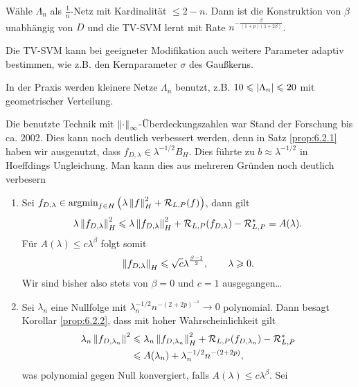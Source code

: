 \begin{bsp*}
Wähle $\Lambda_n$ als $\frac{1}{n}$-Netz mit Kardinalität $\le 2-n$. Dann ist
die Konstruktion von $\beta$ unabhängig von $D$ und die TV-SVM lernt mit Rate
$n^{-\frac{\beta}{(1+p)(1+2\beta)}}$.\bsphere
\end{bsp*}

\begin{bem*}[Bemkerungen.]
\begin{bemenum}
\item Die TV-SVM kann bei geeigneter Modifikation auch weitere Parameter adaptiv
bestimmen, wie z.B. den Kernparameter $\sigma$ des Gaußkerns.
\item In der Praxis werden kleinere Netze $\Lambda_n$ benutzt, z.B.
$10\leqslant \left|\Lambda_n\right|\leqslant 20$ mit geometrischer Verteilung.
\item Die benutzte Technik mit $\left\|\cdot\right\|_\infty$-Überdeckungszahlen war
Stand der Forschung bis ca. 2002. Dies kann noch deutlich verbessert werden,
denn in Satz \ref{prop:6.2.1} haben wir ausgenutzt, dass $f_{D,\lambda}\in
\lambda^{-1/2}B_H$. Dies führte zu $b\approx \lambda^{-1/2}$ in Hoeffdings
Ungleichung. Man kann dies aus mehreren Gründen noch deutlich verbesern
\begin{enumerate}[label=\arabic{*}.),leftmargin=2pt]
  \item Sei $f_{D,\lambda}\in \operatorname*{argmin}_{f\in H}\left( \lambda\left\|f\right\|_H^2 +
  \mathcal{R}_{L,P}(f)\right)$, dann gilt
\begin{align*}
\lambda\left\|f_{D,\lambda}\right\|_H^2
\leqslant
\lambda\left\|f_{D,\lambda}\right\|_H^2 + \mathcal{R}_{L,P}(f_{D,\lambda}) - \mathcal{R}_{L,P}^*
= A(\lambda). 
\end{align*}
Für $A(\lambda)\le c\lambda^\beta$ folgt somit
\begin{align*}
\left\|f_{D,\lambda}\right\|_H \leqslant
\sqrt{c}\lambda^{\frac{\beta-1}{2}},\qquad \lambda \geqslant 0.
\end{align*}
Wir sind bisher also stets von $\beta = 0$ und $c=1$ ausgegangen\ldots
\item Sei $\lambda_n$ eine Nullfolge mit $\lambda_n^{-1/2} n^{-(2+2p)^{-1}} \to
0$ polynomial. Dann besagt Korollar \ref{prop:6.2.2}, dass mit hoher
Wahrscheinlichkeit gilt
\begin{align*}
\lambda_n \left\|f_{D,\lambda_n}\right\|^2 &\leqslant \lambda_n \left\|f_{D,\lambda_n}\right\|_H^2 +
\mathcal{R}_{L,P}(f_{D,\lambda_n}) - \mathcal{R}_{L,P}^*\\ & \leqslant A(\lambda_n)
+ \lambda_n^{-1/2}n^{-(2+2p)},
\end{align*}
was polynomial gegen Null konvergiert, falls $A(\lambda)\le c\lambda^\beta$. Sei

\end{enumerate}
\end{bemenum}
\end{bem*}
